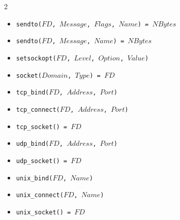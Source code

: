 \documentclass[10pt]{article}
\begin{document}
\begin{multicols}{2}
{\begin{scriptsize}
\begin{itemize}
    \item \texttt{sendto($FD$, $Message$, $Flags$, $Name$) = $NBytes$}
    \item \texttt{sendto($FD$, $Message$, $Name$) = $NBytes$}
    \item \texttt{setsockopt($FD$, $Level$, $Option$, $Value$)}
    \item \texttt{socket($Domain$, $Type$) = $FD$}
    \item \texttt{tcp\_bind($FD$, $Address$, $Port$)}
    \item \texttt{tcp\_connect($FD$, $Address$, $Port$)}
    \item \texttt{tcp\_socket() = $FD$}
    \item \texttt{udp\_bind($FD$, $Address$, $Port$)}
    \item \texttt{udp\_socket() = $FD$}
    \item \texttt{unix\_bind($FD$, $Name$)}
    \item \texttt{unix\_connect($FD$, $Name$)}
    \item \texttt{unix\_socket() = $FD$}
\end{itemize}
\end{scriptsize}
}

\end{multicols}
\end{document}
